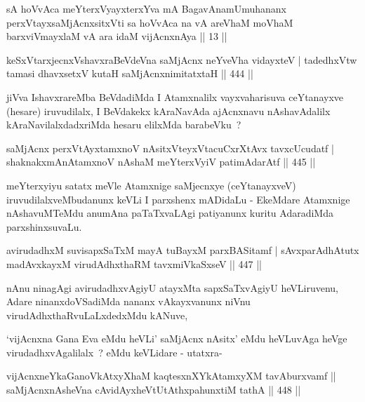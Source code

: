 
\begin{kandikeshl}
sA hoVvAca meYterxVyayxterxYva mA BagavAnamUmuhananx perxVtayx\break saMjAcnxsitxVti sa hoVvAca na vA areV\s haM moVhaM barxviVmayxlaM vA ara idaM vijAcnxnAya || 13 ||
\end{kandikeshl}


\begin{shl}
keSxVtarxjecnxVshavxraBeVdeVna saMjAcnx neYveVha vidayxteV |
tadedhxVtw tamasi dhavxsetxV kutaH saMjAcnx\s nimitatxtaH \hfill || 444 ||
\end{shl}

\begin{artha}
jiVva IshavxrareMba BeVdadiMda I Atamxnalilx vayxvaharisuva ceYtanayxve
(hesare) iruvudilalx, I BeVdakekx kAraNavAda ajAcnxnavu nAshavAdalilx
kAraNavilalxdadxriMda hesaru elilxMda barabeVku~?
\end{artha}

\begin{shl}
saMjAcnx perxVtAyx\s \s tamxnoV nAsitxVteyxVtacuCxrXtAvx tavxcUcudatf |
shaknakxmAnA\s \s tamxnoV nAshaM meYterxVyiV patimAdarAtf \hfill || 445 ||
\end{shl}

\begin{artha}
meYterxyiyu satatx meVle Atamxnige saMjecnxye (ceYtanayxveV)
iruvudilalxveMbudanunx keVLi I parxshenx mADidaLu - EkeMdare Atamxnige
nAshavuMTeMdu anumAna paTaTxvaLAgi patiyanunx kuritu AdaradiMda parxshinxsuvaLu.
\end{artha}

\begin{shl}
avirudadhxM suvisapxSaTxM mayA tuBayxM parxBASitamf |
sAvxparAdhAtutx madAvxkayxM virudAdhxthaRM tavxmiVkaSxseV \hfill || 447 ||
\end{shl}

\begin{artha}
nAnu ninagAgi avirudadhxvAgiyU atayxMta sapxSaTxvAgiyU heVLiruvenu,
Adare ninanxdoVSadiMda nananx vAkayxvanunx niVnu
virudAdhxthaRvuLaLxdedxMdu kANuve,
\end{artha}

\begin{artha}
`vijAcnxna Gana Eva eMdu heVLi' saMjAcnx nAsitx' eMdu heVLuvAga heVge
 virudadhxvAgalilalx~? eMdu keVLidare - utatxra-
\end{artha}

\begin{shl}
vijAcnxneYkaGanoVkAtxyX\s haM kaqtesxnXYkAtamxyXM tavAburxvamf ||
saMjAcnxnAsheVna cAvidAyxheVtUtAthxpahunxtiM tathA \hfill || 448 ||
\end{shl}

